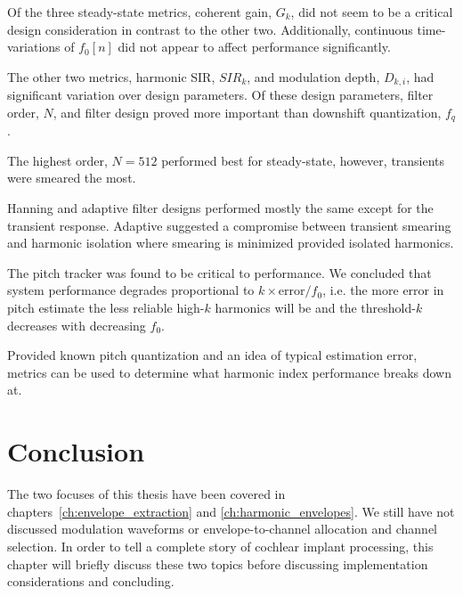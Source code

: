 \documentclass [11pt, proquest,oneside] {ganter_thesis}[2015/03/03]
\begin{document}
Of the three steady-state metrics, coherent gain, $G_k$, did not seem to be a critical design consideration in contrast to the other two.  Additionally, continuous time-variations of $f_0[n]$ did not appear to affect performance significantly.

The other two metrics, harmonic SIR, $SIR_k$, and modulation depth, $D_{k,i}$, had significant variation over design parameters.  Of these design parameters, filter order, $N$, and filter design proved more important than downshift quantization, $f_q$.

The highest order, $N = 512$ performed best for steady-state, however, transients were smeared the most.

Hanning and adaptive filter designs performed mostly the same except for the transient response.  Adaptive suggested a compromise between transient smearing and harmonic isolation where smearing is minimized provided isolated harmonics.

The pitch tracker was found to be critical to performance.  We concluded that system performance degrades proportional to $k \times \mathrm{error} / f_0$, i.e. the more error in pitch estimate the less reliable high-$k$ harmonics will be and the threshold-$k$ decreases with decreasing $f_0$.

Provided known pitch quantization and an idea of typical estimation error, metrics can be used to determine what harmonic index performance breaks down at.



\chapter{Conclusion}\label{ch:conclusion}

The two focuses of this thesis have been covered in chapters~\ref{ch:envelope_extraction} and \ref{ch:harmonic_envelopes}.  We still have not discussed modulation waveforms or envelope-to-channel allocation and channel selection.  In order to tell a complete story of cochlear implant processing, this chapter will briefly discuss these two topics before discussing implementation considerations and concluding.
\end{document}

